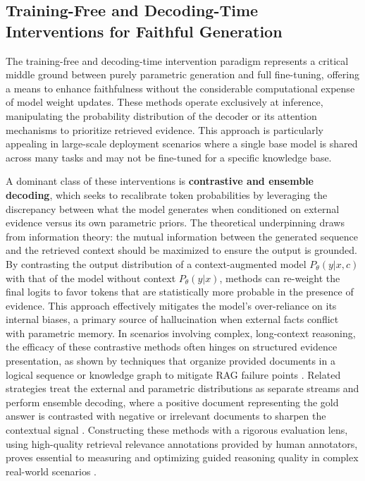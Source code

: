 \documentclass[11pt,a4paper]{article}
\begin{document}
\subsection{Training-Free and Decoding-Time Interventions for Faithful Generation}


The training-free and decoding-time intervention paradigm represents a critical middle ground between purely parametric generation and full fine-tuning, offering a means to enhance faithfulness without the considerable computational expense of model weight updates. These methods operate exclusively at inference, manipulating the probability distribution of the decoder or its attention mechanisms to prioritize retrieved evidence. This approach is particularly appealing in large-scale deployment scenarios where a single base model is shared across many tasks and may not be fine-tuned for a specific knowledge base.

A dominant class of these interventions is \textbf{contrastive and ensemble decoding}, which seeks to recalibrate token probabilities by leveraging the discrepancy between what the model generates when conditioned on external evidence versus its own parametric priors. The theoretical underpinning draws from information theory: the mutual information between the generated sequence and the retrieved context should be maximized to ensure the output is grounded. By contrasting the output distribution of a context-augmented model \(P_\theta(y|x, c)\) with that of the model without context \(P_\theta(y|x)\), methods can re-weight the final logits to favor tokens that are statistically more probable in the presence of evidence. This approach effectively mitigates the model's over-reliance on its internal biases, a primary source of hallucination when external facts conflict with parametric memory. In scenarios involving complex, long-context reasoning, the efficacy of these contrastive methods often hinges on structured evidence presentation, as shown by techniques that organize provided documents in a logical sequence or knowledge graph to mitigate RAG failure points \cite{arxiv:2504.15909v2}. Related strategies treat the external and parametric distributions as separate streams and perform ensemble decoding, where a positive document representing the gold answer is contrasted with negative or irrelevant documents to sharpen the contextual signal \cite{arxiv:2503.04338v2}. Constructing these methods with a rigorous evaluation lens, using high-quality retrieval relevance annotations provided by human annotators, proves essential to measuring and optimizing guided reasoning quality in complex real-world scenarios \cite{arxiv:2601.08620v2}.
\end{document}
